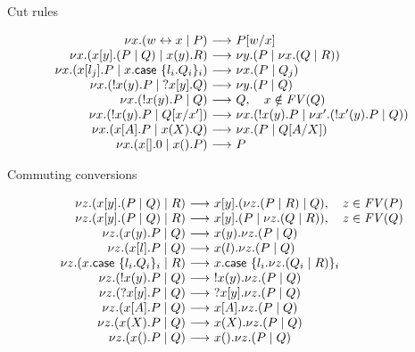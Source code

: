 \documentclass{easychair}
\makeatletter
\newcommand{\ba}{\begin{array}}
\newcommand{\ea}{\end{array}}
\newenvironment{equations}{\[\ba{@{}r@{~}c@{~}l@{}}}{\ea\]}
\newcommand{\key}{\mathsf}
\newcommand{\set}[1]{\{ #1 \}}
\newcommand{\row}[2]{\set{#1}_{#2}}
\newcommand{\la}{l}
\newcommand{\cpLink}[2]{{#1} \leftrightarrow {#2}}
\newcommand{\cpCut}[3]{\nu {#1}.({#2} \mid {#3})}
\newcommand{\cpOutput}[4]{{#1}[{#2}].({#3} \mid {#4})}
\newcommand{\cpInput}[3]{{#1}({#2}).{#3}}
\newcommand{\cpInject}[3]{{#1}[{#2}].{#3}}
\newcommand{\cpCase}[2]{{#1}.\key{case}~{#2}}
\newcommand{\cpServe}[3]{!{#1}({#2}).{#3}}
\newcommand{\cpRequest}[3]{?{#1}[{#2}].{#3}}
\newcommand{\cpEmptyOut}[1]{{#1}[].0}
\newcommand{\cpEmptyIn}[2]{{#1}().{#2}}
\newcommand{\cpSendType}[3]{{#1}[{#2}].{#3}}
\newcommand{\cpReceiveType}[3]{{#1}({#2}).{#3}}
\newcommand{\FV}[1]{\mathit{FV}(#1)}
\newcommand{\subst}[3]{{#1}[{#2}/{#3}]}
\newcommand{\redto}{\longrightarrow}
\makeatother
\begin{document}
Cut rules

\begin{equations}
\cpCut{x}{\cpLink{w}{x}}{P}
  &\redto& \subst{P}{w}{x} \\
\cpCut{x}{\cpOutput{x}{y}{P}{Q}}{\cpInput{x}{y}{R}}
  &\redto& \cpCut{y}{P}{\cpCut{x}{Q}{R}} \\
\cpCut{x}{\cpInject{x}{\la_j}{P}}{\cpCase{x}{\row{\la_i.Q_i}{i}}}
  &\redto& \cpCut{x}{P}{Q_j} \\
\cpCut{x}{\cpServe{x}{y}{P}}{\cpRequest{x}{y}{Q}}
  &\redto& \cpCut{y}{P}{Q} \\
\cpCut{x}{\cpServe{x}{y}{P}}{Q}
  &\redto& Q, \quad x \notin \FV{Q} \\
\cpCut{x}{\cpServe{x}{y}{P}}{\subst{Q}{x}{x'}}
  &\redto& \cpCut{x}{\cpServe{x}{y}{P}}{\cpCut{x'}{\cpServe{x'}{y}{P}}{Q}} \\
\cpCut{x}{\cpSendType{x}{A}{P}}{\cpReceiveType{x}{X}{Q}}
  &\redto& \cpCut{x}{P}{\subst{Q}{A}{X}} \\
\cpCut{x}{\cpEmptyOut{x}}{\cpEmptyIn{x}{P}}
  &\redto& P \\
\end{equations}

Commuting conversions

\begin{equations}
\cpCut{z}{\cpOutput{x}{y}{P}{Q}}{R}
  &\redto& \cpOutput{x}{y}{\cpCut{z}{P}{R}}{Q}, \quad z \in \FV{P} \\
\cpCut{z}{\cpOutput{x}{y}{P}{Q}}{R}
  &\redto& \cpOutput{x}{y}{P}{\cpCut{z}{Q}{R}}, \quad z \in \FV{Q} \\
\cpCut{z}{\cpInput{x}{y}{P}}{Q}
  &\redto& \cpInput{x}{y}{\cpCut{z}{P}{Q}} \\
\cpCut{z}{\cpInject{x}{\la}{P}}{Q}
  &\redto& \cpInput{x}{\la}{\cpCut{z}{P}{Q}} \\
\cpCut{z}{\cpCase{x}{\row{\la_i.Q_i}{i}}}{R}
  &\redto& \cpCase{x}{\row{\la_i.\cpCut{z}{Q_i}{R}}{i}} \\
\cpCut{z}{\cpServe{x}{y}{P}}{Q}
  &\redto& \cpServe{x}{y}{\cpCut{z}{P}{Q}} \\
\cpCut{z}{\cpRequest{x}{y}{P}}{Q}
  &\redto& \cpRequest{x}{y}{\cpCut{z}{P}{Q}} \\
\cpCut{z}{\cpSendType{x}{A}{P}}{Q}
  &\redto& \cpSendType{x}{A}{\cpCut{z}{P}{Q}} \\
\cpCut{z}{\cpReceiveType{x}{X}{P}}{Q}
  &\redto& \cpReceiveType{x}{X}{\cpCut{z}{P}{Q}} \\
\cpCut{z}{\cpEmptyIn{x}{P}}{Q}
  &\redto& \cpEmptyIn{x}{\cpCut{z}{P}{Q}} \\
\end{equations}
\end{document}
